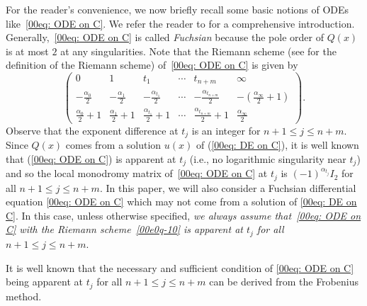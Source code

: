 \documentclass[pdftex]{sigma}
\numberwithin{equation}{section}
\begin{document}
For the reader's convenience, we now briefly recall some basic notions
of ODEs like~\eqref{00eq: ODE on C}. We refer the reader to
\cite{Yoshida,Whittaker-Watson} for a comprehensive
introduction. Generally,~\eqref{00eq: ODE on C} is called
\emph{Fuchsian} because the pole order of $Q(x)$ is at most $2$ at any
singularities.
Note that the Riemann scheme (see \cite[p.~11]{Yoshida} for the definition of the Riemann scheme) of~\eqref{00eq: ODE on C} is
 given by
\begin{equation}\label{00e0q-10}\begin{pmatrix}
0&1&t_1&\cdots& t_{n+m}&\infty\\
-\frac{{\alpha}_0}{2} &-\frac{{\alpha}_1}{2}&-\frac{{\alpha}_{t_1}}{2}&\cdots&-\frac{{\alpha}_{t_{n+m}}}{2}&-(\frac{{\alpha}_\infty}{2}+1)\\
\frac{{\alpha}_0}{2}+1&\frac{{\alpha}_1}{2}+1&\frac{{\alpha}_{t_1}}{2}+1&\cdots&\frac{{\alpha}_{t_{n+m}}}{2}+1&\frac{{\alpha}_\infty}{2}
\end{pmatrix}.\end{equation}
Observe that the exponent difference at $t_j$ is an integer for
$n+1\leq j\leq n+m$.
Since $Q(x)$ comes from a solution $u(x)$ of (\ref{00eq: DE on C}), it is well known that
(\ref{00eq: ODE on C}) is apparent at $t_j$ \big(i.e., no logarithmic
singularity near $t_j$\big) and so
the local monodromy matrix of~\eqref{00eq: ODE on C} at $t_j$ is
$(-1)^{{\alpha}_{t_j}}I_2$ for all $n+1\leq j\leq n+m$.
In this paper, we will also consider a Fuchsian differential equation
\eqref{00eq: ODE on C} which may not come from a solution of
\eqref{00eq: DE on C}. In this case, unless otherwise specified,
\emph{we always assume that~\eqref{00eq: ODE on C} with the Riemann
 scheme~\eqref{00e0q-10} is apparent at $t_j$ for all $n+1\leq j\leq
 n+m$}.

It is well known that the necessary and sufficient condition of
\eqref{00eq: ODE on C} being apparent at $t_j$ for all $n+1\leq j\leq
n+m$ can be derived from the Frobenius method.
\end{document}
